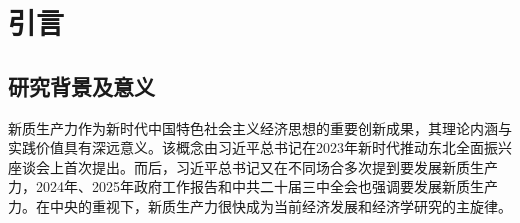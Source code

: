 
\chapter{引言}

\section{研究背景及意义}

新质生产力作为新时代中国特色社会主义经济思想的重要创新成果，其理论内涵与实践价值具有深远意义。该概念由习近平总书记在2023年新时代推动东北全面振兴座谈会上首次提出\cite{YinBoGuLaoLaoBaWoDongBeiDeChongYaoShiMingFenLiPuXieDongBeiQuanMianZhenXingXinPianZhang2023}。而后，习近平总书记又在不同场合多次提到要发展新质生产力，2024年\cite[17]{LiQiangZhengFuGongZuoBaoGao2024Nian3Yue5RiZaiDiShiSiJieQuanGuoRenMinDaiBiaoDaHuiDiErCiHuiYiShang2024}、2025年\cite[19]{LiQiangZhengFuGongZuoBaoGao2025Nian3Yue5RiZaiDiShiSiJieQuanGuoRenMinDaiBiaoDaHuiDiSanCiHuiYiShang2025}政府工作报告和中共二十届三中全会\cite[8]{ZhongGuoGongChanDangDiErShiJieZhongYangWeiYuanHuiDiSanCiQuanTiHuiYiGongBao2024}也强调要发展新质生产力。在中央的重视下，新质生产力很快成为当前经济发展和经济学研究的主旋律。


